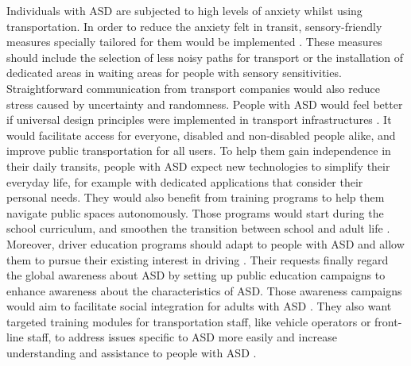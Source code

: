     Individuals with ASD are subjected to high levels of anxiety whilst using transportation. In order to reduce the anxiety felt in transit, sensory-friendly measures specially tailored for them would be implemented \cite{haas_experiences_nodate}. These measures should include the selection of less noisy paths for transport or the installation of dedicated areas in waiting areas for people with sensory sensitivities. Straightforward communication from transport companies would also reduce stress caused by uncertainty and randomness.
    \newline
    \newline
    People with ASD would feel better if universal design principles were implemented in transport infrastructures \cite{haas_experiences_nodate}. It would facilitate access for everyone, disabled and non-disabled people alike, and improve public transportation for all users.
    \newline
    \newline
    To help them gain independence in their daily transits, people with ASD expect new technologies to simplify their everyday life, for example with dedicated applications that consider their personal needs. They would also benefit from training programs to help them navigate public spaces autonomously. Those programs would start during the school curriculum, and smoothen the transition between school and adult life \cite{deka_co-principal_nodate}. Moreover, driver education programs should adapt to people with ASD and allow them to pursue their existing interest in driving \cite{deka_co-principal_nodate}. 
    \newline
    \newline
    Their requests finally regard the global awareness about ASD by setting up public education campaigns to enhance awareness about the characteristics of ASD. Those awareness campaigns would aim to facilitate social integration for adults with ASD \cite{deka_co-principal_nodate}. They also want targeted training modules for transportation staff, like vehicle operators or front-line staff, to address issues specific to ASD more easily and increase understanding and assistance to people with ASD \cite{haas_experiences_nodate}. 
\newline
